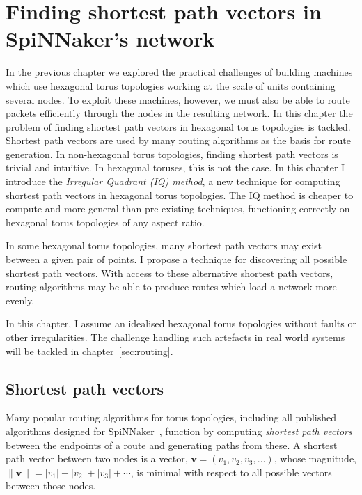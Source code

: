 \chapter{Finding shortest path vectors in SpiNNaker's network}
	
	\label{sec:shortestPaths}
	
	
	In the previous chapter we explored the practical challenges of building
	machines which use hexagonal torus topologies working at the scale of units
	containing several nodes. To exploit these machines, however, we must also be
	able to route packets efficiently through the nodes in the resulting network.
	In this chapter the problem of finding shortest path vectors in hexagonal
	torus topologies is tackled. Shortest path vectors are used by many routing
	algorithms as the basis for route generation. In non-hexagonal torus
	topologies, finding shortest path vectors is trivial and intuitive. In
	hexagonal toruses, this is not the case.  In this chapter I introduce the
	\emph{Irregular Quadrant (IQ) method}, a new technique for computing shortest
	path vectors in hexagonal torus topologies.  The IQ method is cheaper to
	compute and more general than pre-existing techniques, functioning correctly
	on hexagonal torus topologies of any aspect ratio.
	
	In some hexagonal torus topologies, many shortest path vectors may exist
	between a given pair of points. I propose a technique for discovering all
	possible shortest path vectors. With access to these alternative shortest
	path vectors, routing algorithms may be able to produce routes which load a
	network more evenly.
	
	In this chapter, I assume an idealised hexagonal torus topologies without
	faults or other irregularities. The challenge handling such artefacts in real
	world systems will be tackled in chapter~\ref{sec:routing}.
	
	\section{Shortest path vectors}
		
		Many popular routing algorithms for torus topologies, including all
		published algorithms designed for SpiNNaker~\cite{davies12,navaridas14},
		function by computing \emph{shortest path vectors} between the endpoints of
		a route and generating paths from these. A shortest path vector between two
		nodes is a vector, $\mathbf{v} = (v_1, v_2, v_3, \ldots)$, whose magnitude,
		$\| \mathbf{v} \| = \lvert v_1 \rvert + \lvert v_2 \rvert + \lvert v_3
		\rvert + \cdots$, is minimal with respect to all possible vectors between
		those nodes.
		
